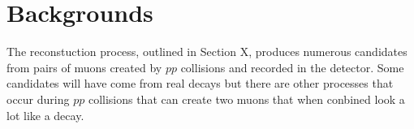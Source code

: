 \section{Backgrounds}
\label{sec:backgroundoutline}


The reconstuction process, outlined in Section X, produces numerous \bsmumu candidates from pairs of muons created by $pp$ collisions and recorded in the detector. Some candidates will have come from real \bsmumu decays but there are other processes that occur during $pp$ collisions that can create two muons that when conbined look a lot like a \bsmumu decay. %


